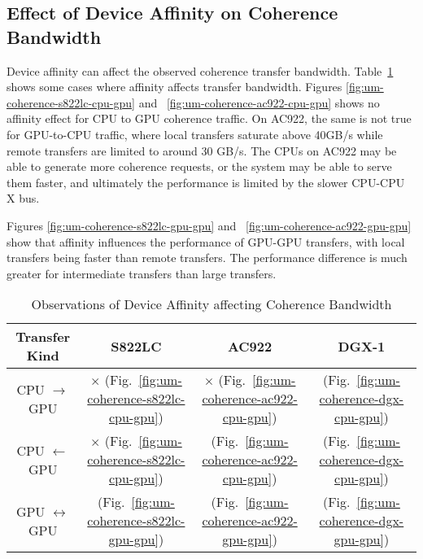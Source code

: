 \subsection{Effect of Device Affinity on Coherence Bandwidth}

Device affinity can affect the observed coherence transfer bandwidth.
Table~\ref{tab:um-coherence-affinity} shows some cases where affinity affects transfer bandwidth.
Figures \ref{fig:um-coherence-s822lc-cpu-gpu} and ~\ref{fig:um-coherence-ac922-cpu-gpu} shows no affinity effect for CPU to GPU coherence traffic.
On AC922, the same is not true for GPU-to-CPU traffic, where local transfers saturate above 40GB/s while remote transfers are limited to around 30 GB/s.
The CPUs on AC922 may be able to generate more coherence requests, or the system may be able to serve them faster, and ultimately the performance is limited by the slower CPU-CPU X bus.

Figures \ref{fig:um-coherence-s822lc-gpu-gpu} and ~\ref{fig:um-coherence-ac922-gpu-gpu} show that affinity influences the performance of GPU-GPU transfers, with local transfers being faster than remote transfers.
The performance difference is much greater for intermediate transfers than large transfers.

\begin{table}[ht]
	\centering
	\caption[]{Observations of Device Affinity affecting Coherence Bandwidth}
	\label{tab:um-coherence-affinity}
	\begin{tabular}{|c|c|c|c|}
		\hline
		\textbf{Transfer Kind}    & \textbf{S822LC}                                         & \textbf{AC922}                                         & \textbf{DGX-1}                            \\ \hline 
		CPU $\rightarrow$     GPU & $\times$   (Fig.~\ref{fig:um-coherence-s822lc-cpu-gpu}) & $\times$   (Fig.~\ref{fig:um-coherence-ac922-cpu-gpu}) & (Fig.~\ref{fig:um-coherence-dgx-cpu-gpu}) \\ \hline
		CPU $\leftarrow$      GPU & $\times$   (Fig.~\ref{fig:um-coherence-s822lc-cpu-gpu}) & \checkmark (Fig.~\ref{fig:um-coherence-ac922-cpu-gpu}) & (Fig.~\ref{fig:um-coherence-dgx-cpu-gpu}) \\ \hline
		GPU $\leftrightarrow$ GPU & \checkmark (Fig.~\ref{fig:um-coherence-s822lc-gpu-gpu}) & \checkmark (Fig.~\ref{fig:um-coherence-ac922-gpu-gpu}) & (Fig.~\ref{fig:um-coherence-dgx-gpu-gpu}) \\ \hline
	\end{tabular}
\end{table}


